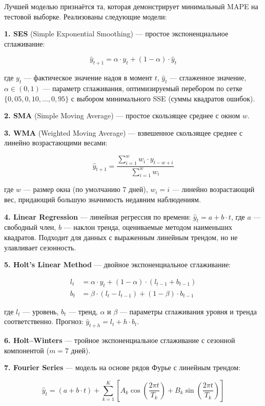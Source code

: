 Лучшей моделью признаётся та, которая демонстрирует минимальный MAPE на тестовой выборке. Реализованы следующие модели:

\textbf{1. SES} (Simple Exponential Smoothing) --- простое экспоненциальное сглаживание:

$$\hat{y}_{t+1} = \alpha \cdot y_t + (1 - \alpha) \cdot \hat{y}_t$$

где $y_t$ --- фактическое значение надоя в момент $t$, $\hat{y}_t$ --- сглаженное значение, $\alpha \in (0, 1)$ --- параметр сглаживания, оптимизируемый перебором по сетке $\{0{,}05, 0{,}10, \ldots, 0{,}95\}$ с выбором минимального SSE (суммы квадратов ошибок).

\textbf{2. SMA} (Simple Moving Average) --- простое скользящее среднее с окном $w$.

\textbf{3. WMA} (Weighted Moving Average) --- взвешенное скользящее среднее с линейно возрастающими весами:

$$\hat{y}_{t+1} = \frac{\sum_{i=1}^{w} w_i \cdot y_{t-w+i}}{\sum_{i=1}^{w} w_i}$$

где $w$ --- размер окна (по умолчанию 7 дней), $w_i = i$ --- линейно возрастающий вес, придающий большую значимость недавним наблюдениям.

\textbf{4. Linear Regression} --- линейная регрессия по времени: $\hat{y}_t = a + b \cdot t$, где $a$ --- свободный член, $b$ --- наклон тренда, оцениваемые методом наименьших квадратов. Подходит для данных с выраженным линейным трендом, но не улавливает сезонность.

\textbf{5. Holt's Linear Method} --- двойное экспоненциальное сглаживание:

\begin{align}
l_t &= \alpha \cdot y_t + (1 - \alpha) \cdot (l_{t-1} + b_{t-1}) \\
b_t &= \beta \cdot (l_t - l_{t-1}) + (1 - \beta) \cdot b_{t-1}
\end{align}

где $l_t$ --- уровень, $b_t$ --- тренд, $\alpha$ и $\beta$ --- параметры сглаживания уровня и тренда соответственно. Прогноз: $\hat{y}_{t+h} = l_t + h \cdot b_t$.

\textbf{6. Holt--Winters} --- тройное экспоненциальное сглаживание с сезонной компонентой ($m = 7$ дней).

\textbf{7. Fourier Series} --- модель на основе рядов Фурье с линейным трендом:

$$\hat{y}_t = (a + b \cdot t) + \sum_{k=1}^{K} \left[ A_k \cos\!\left(\frac{2\pi t}{T_k}\right) + B_k \sin\!\left(\frac{2\pi t}{T_k}\right) \right]$$

